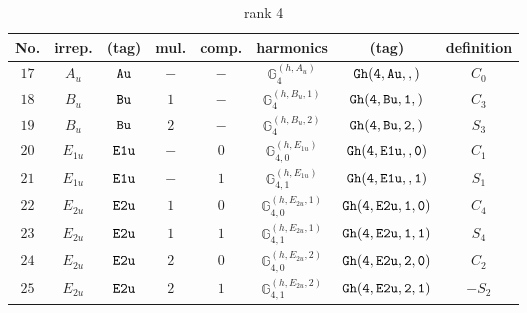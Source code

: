 \documentclass[fleqn,8pt]{jsarticle}
\begin{document}
\begin{table}[ht!]
\begin{center}
\caption{rank 4}
\renewcommand{\arraystretch}{1.3}
\begin{tabular}{cccccccc} \hline \hline
No. & irrep. & (tag) & mul. & comp. & harmonics & (tag) & definition \\ \hline
$ 17 $ & $ A_{u} $ & $ {\tt Au} $ & $ - $ & $ - $ & $ \mathbb{G}_{4}^{(h,A_{u})} $ & $ {\tt Gh(4,Au,,)} $ & $ C_{0} $ \\
$ 18 $ & $ B_{u} $ & $ {\tt Bu} $ & $ 1 $ & $ - $ & $ \mathbb{G}_{4}^{(h,B_{u},1)} $ & $ {\tt Gh(4,Bu,1,)} $ & $ C_{3} $ \\
$ 19 $ & $ B_{u} $ & $ {\tt Bu} $ & $ 2 $ & $ - $ & $ \mathbb{G}_{4}^{(h,B_{u},2)} $ & $ {\tt Gh(4,Bu,2,)} $ & $ S_{3} $ \\
$ 20 $ & $ E_{1u} $ & $ {\tt E1u} $ & $ - $ & $ 0 $ & $ \mathbb{G}_{4,0}^{(h,E_{1u})} $ & $ {\tt Gh(4,E1u,,0)} $ & $ C_{1} $ \\
$ 21 $ & $ E_{1u} $ & $ {\tt E1u} $ & $ - $ & $ 1 $ & $ \mathbb{G}_{4,1}^{(h,E_{1u})} $ & $ {\tt Gh(4,E1u,,1)} $ & $ S_{1} $ \\
$ 22 $ & $ E_{2u} $ & $ {\tt E2u} $ & $ 1 $ & $ 0 $ & $ \mathbb{G}_{4,0}^{(h,E_{2u},1)} $ & $ {\tt Gh(4,E2u,1,0)} $ & $ C_{4} $ \\
$ 23 $ & $ E_{2u} $ & $ {\tt E2u} $ & $ 1 $ & $ 1 $ & $ \mathbb{G}_{4,1}^{(h,E_{2u},1)} $ & $ {\tt Gh(4,E2u,1,1)} $ & $ S_{4} $ \\
$ 24 $ & $ E_{2u} $ & $ {\tt E2u} $ & $ 2 $ & $ 0 $ & $ \mathbb{G}_{4,0}^{(h,E_{2u},2)} $ & $ {\tt Gh(4,E2u,2,0)} $ & $ C_{2} $ \\
$ 25 $ & $ E_{2u} $ & $ {\tt E2u} $ & $ 2 $ & $ 1 $ & $ \mathbb{G}_{4,1}^{(h,E_{2u},2)} $ & $ {\tt Gh(4,E2u,2,1)} $ & $ - S_{2} $ \\
 \hline \hline
\end{tabular}
\end{center}
\end{table}
\end{document}
